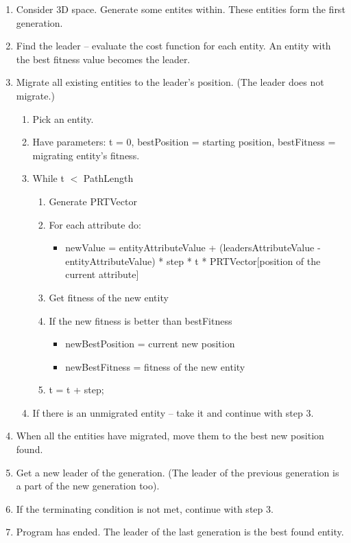\documentclass[review]{elsarticle}
\begin{document}
\begin{enumerate}
	\item Consider 3D space. Generate some entites within. These entities form the first generation.
	
	\item Find the leader -- evaluate the cost function for each entity. An entity with the best fitness value becomes the leader.
	 
	\item Migrate all existing entities to the leader's position. (The leader does not migrate.)
	\begin{enumerate}
		\item Pick an entity.
		\item Have parameters: t = 0, bestPosition = starting position, bestFitness = migrating entity's fitness.
		\item While t $<$ PathLength
		\begin{enumerate}
			\item Generate PRTVector
			\item For each attribute do:
			\begin{itemize}
				\item newValue = entityAttributeValue + (leadersAttributeValue - entityAttributeValue) * step * t * PRTVector[position of the current attribute]
			\end{itemize}
			\item Get fitness of the new entity
			\item If the new fitness is better than bestFitness
			\begin{itemize}
				\item newBestPosition = current new position
				\item newBestFitness = fitness of the new entity
			\end{itemize}
			\item t = t + step;
		\end{enumerate}
		\item If there is an unmigrated entity -- take it and continue with step 3.
	\end{enumerate}	 
	\item When all the entities have migrated, move them to the best new position found.
	\item Get a new leader of the generation. (The leader of the previous generation is a part of the new generation too).
	\item If the terminating condition is not met, continue with step 3.
	\item Program has ended. The leader of the last generation is the best found entity.
\end{enumerate}
\vspace{10pt}
\end{document}
